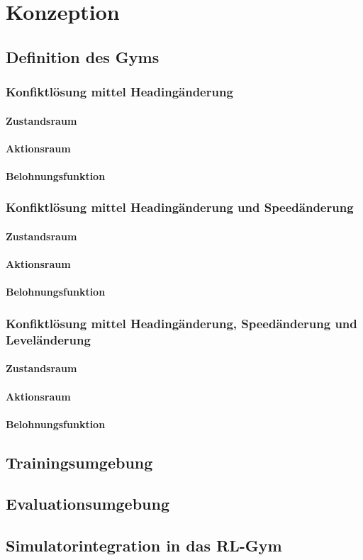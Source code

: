 \chapter{Konzeption}
\label{ch:konzeption}

\section{Definition des Gyms}
\subsection{Konfiktlösung mittel Headingänderung}
\subsubsection{Zustandsraum}
\subsubsection{Aktionsraum}
\subsubsection{Belohnungsfunktion}

\subsection{Konfiktlösung mittel Headingänderung und Speedänderung}
\subsubsection{Zustandsraum}
\subsubsection{Aktionsraum}
\subsubsection{Belohnungsfunktion}

\subsection{Konfiktlösung mittel Headingänderung, Speedänderung und Leveländerung}
\subsubsection{Zustandsraum}
\subsubsection{Aktionsraum}
\subsubsection{Belohnungsfunktion}

\section{Trainingsumgebung}
\section{Evaluationsumgebung}

\section{Simulatorintegration in das RL-Gym}
